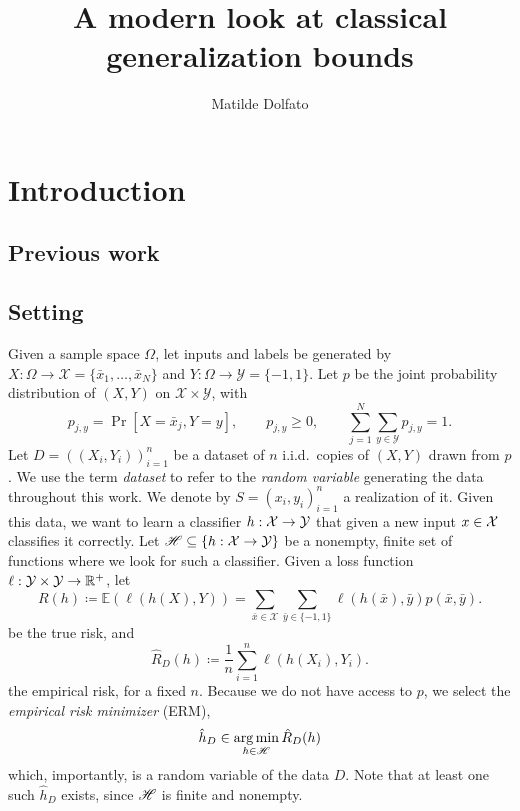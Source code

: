 \documentclass[reqno]{amsart}
\title{A modern look at classical generalization bounds}
\author{Matilde Dolfato}
\let\oldsection\section
\renewcommand{\section}{\clearpage\thispagestyle{plain}\oldsection}
\begin{document}
\begin{abstract}

\end{abstract}

\maketitle

\newpage
\tableofcontents

\newpage
\section{Introduction}

\subsection{Previous work}\label{sec: rel lit}



\subsection{Setting}

Given a sample space $\Omega$, let inputs and labels be generated by $X:\Omega \to \mathcal X = \{\bar x_1,\ldots,\bar x_N\}$ and $Y: \Omega \to \mathcal Y = \{-1, 1\}$. Let $p$ be the joint probability distribution of $(X,Y)$ on $\mathcal X\times\mathcal Y$, with
\[
 p_{j,y}=\Pr[X=\bar x_j,Y=y],\qquad
 p_{j,y}\ge0,\qquad
 \sum_{j=1}^N\sum_{y\in\mathcal Y}p_{j,y}=1.
\]
Let $D = {((X_i, Y_i))}_{i=1}^n$ be a dataset of $n$ i.i.d.\ copies of $(X,Y)$ drawn from $p$. We use the term {\it dataset\/} to refer to the {\it random variable\/} generating the data throughout this work. We denote by $S = {(x_i, y_i)}_{i=1}^n$ a realization of it. Given this data, we want to learn a classifier $h:\mathcal{X}\to\mathcal{Y}$ that given a new input $x\in\mathcal{X}$ classifies it correctly. 
Let $\mathscr{H} \subseteq \{h:\mathcal X \to \mathcal{Y}\}$ be a nonempty, finite set of functions where we look for such a classifier.
Given a loss function $\ell:\mathcal{Y} \times \mathcal Y \to \mathbb R^+$, let
\[
    R(h) \coloneq \mathbb E(\ell(h(X), Y)) = \sum_{\bar x\in\mathcal X} \sum_{\bar y \in\{-1,1\}} \ell(h(\bar x), \bar y) p(\bar x, \bar y).
\]
be the true risk, and
\[
    \hat R_D (h) \coloneq \frac{1}{n}\sum_{i=1}^n \ell(h(X_i), Y_i).
\]
the empirical risk, for a fixed $n$. 
Because we do not have access to $p$, we select the {\it empirical risk minimizer\/} (ERM), 
\begin{equation*}\label{eq: ERM}
    \hat h_D \in \operatorname*{arg\,min}_{h\in \mathscr{H}} \hat R_D (h)
\end{equation*}
which, importantly, is a random variable of the data $D$. Note that at least one such $\hat h_D$ exists, since $\mathscr{H}$ is finite and nonempty. 
\end{document}
